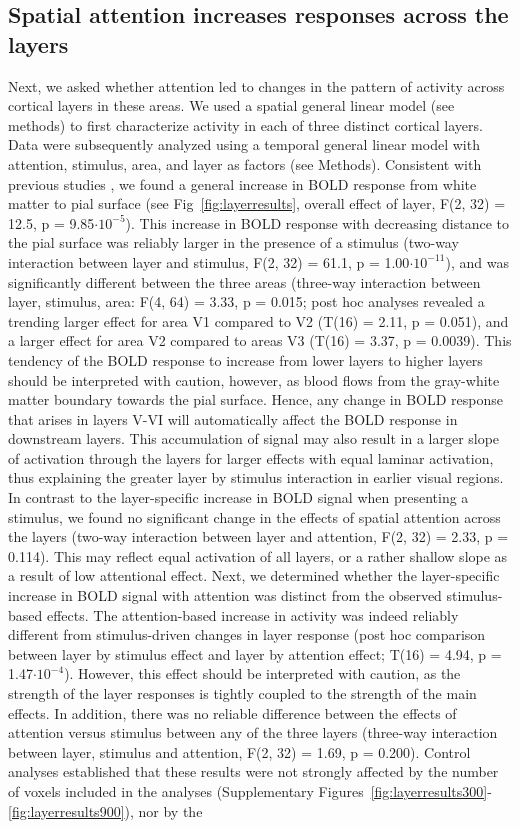 \subsection{Spatial attention increases responses across the layers}
Next, we asked whether attention led to changes in the pattern of activity across cortical layers in these areas. We used a spatial general linear model (see methods) to first characterize activity in each of three distinct cortical layers. Data were subsequently analyzed using a temporal general linear model with attention, stimulus, area, and layer as factors (see Methods). Consistent with previous studies \cite{Koopmans2010,Polimeni2010}, we found a general increase in BOLD response from white matter to pial surface (see Fig~\ref{fig:layerresults}, overall effect of layer, F(2, 32) = 12.5, p = 9.85$\cdot10^{-5}$). This increase in BOLD response with decreasing distance to the pial surface was reliably larger in the presence of a stimulus (two-way interaction between layer and stimulus, F(2, 32) = 61.1, p = 1.00$\cdot10^{-11}$), and was significantly different between the three areas (three-way interaction between layer, stimulus, area: F(4, 64) = 3.33, p = 0.015; post hoc analyses revealed a trending larger effect for area V1 compared to V2 (T(16) = 2.11, p = 0.051), and a larger effect for area V2 compared to areas V3 (T(16) = 3.37, p = 0.0039). This tendency of the BOLD response to increase from lower layers to higher layers should be interpreted with caution, however, as blood flows from the gray-white matter boundary towards the pial surface. Hence, any change in BOLD response that arises in layers V-VI will automatically affect the BOLD response in downstream layers. This accumulation of signal may also result in a larger slope of activation through the layers for larger effects with equal laminar activation, thus explaining the greater layer by stimulus interaction in earlier visual regions. In contrast to the layer-specific increase in BOLD signal when presenting a stimulus, we found no significant change in the effects of spatial attention across the layers (two-way interaction between layer and attention, F(2, 32) = 2.33, p = 0.114). This may reflect equal activation of all layers, or a rather shallow slope as a result of low attentional effect. Next, we determined whether the layer-specific increase in BOLD signal with attention was distinct from the observed stimulus-based effects. The attention-based increase in activity was indeed reliably different from stimulus-driven changes in layer response (post hoc comparison between layer by stimulus effect and layer by attention effect; T(16) = 4.94, p = 1.47$\cdot10^{-4}$). However, this effect should be interpreted with caution, as the strength of the layer responses is tightly coupled to the strength of the main effects. In addition, there was no reliable difference between the effects of attention versus stimulus between any of the three layers (three-way interaction between layer, stimulus and attention, F(2, 32) = 1.69, p = 0.200). Control analyses established that these results were not strongly affected by the number of voxels included in the analyses (Supplementary Figures~\ref{fig:layerresults300}-\ref{fig:layerresults900}), nor by the 